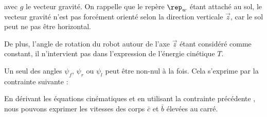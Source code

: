 					avec $g$ le vecteur gravité. On rappelle que le repère $\rep_w$ étant attaché au sol, le vecteur gravité n'est pas forcément orienté selon la direction verticale $\vec{z}$, car le sol peut ne pas être horizontal.
					
					De plus, l'angle de rotation du robot autour de l'axe $\vec{z}$ étant considéré comme constant, il n'intervient pas dans l'expression de l’énergie cinétique $T$. 
					
					Un seul des angles $\psi_f$, $\psi_r$ ou $\psi_l$ peut être non-nul à la fois. Cela s'exprime par la contrainte suivante :
					
				
					En dérivant les équations cinématiques  et en utilisant la contrainte précédente , nous pouvons exprimer les vitesses des corps $\bar{c}$ et $\bar{b}$ élevées au carré.
			
